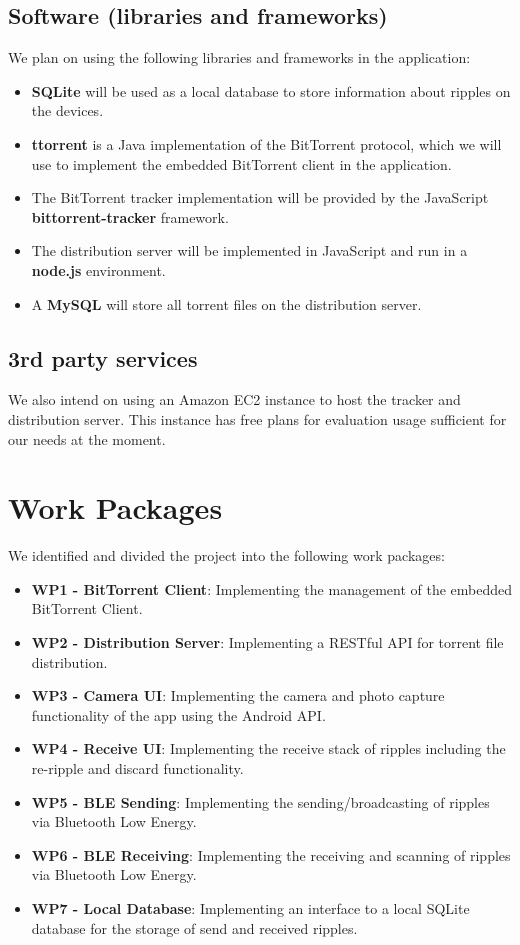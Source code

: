 \documentclass{report}
\begin{document}
\subsection{Software (libraries and frameworks)}
We plan on using the following libraries and frameworks in the application:
\begin{itemize}
  \item \textbf{SQLite} \cite{sqliteLink} will be used as a local database to store information about ripples on the devices.
  \item \textbf{ttorrent} \cite{ttorrentLink} is a Java implementation of the BitTorrent protocol, which we will use to implement the embedded BitTorrent client in the application.
  \item The BitTorrent tracker implementation will be provided by the JavaScript \textbf{bittorrent-tracker} \cite{bittorrentTrackerLink} framework.
  \item The distribution server will be implemented in JavaScript and run in a \textbf{node.js} \cite{nodejsLink} environment.
  \item A \textbf{MySQL} \cite{MySQLLink} will store all torrent files on the distribution server.
\end{itemize}

\subsection{3rd party services}
We also intend on using an Amazon EC2 instance to host the tracker and distribution server.
This instance has free plans for evaluation usage sufficient for our needs at the moment.

\section{Work Packages}
We identified and divided the project into the following work packages: 

\begin{itemize}
    \item {\bf WP1 - BitTorrent Client}: Implementing the management of the embedded BitTorrent Client.
    \item {\bf WP2 - Distribution Server}: Implementing a RESTful API for torrent file distribution.
    \item {\bf WP3 - Camera UI}: Implementing the camera and photo capture functionality of the app using the Android API.
    \item {\bf WP4 - Receive UI}: Implementing the receive stack of ripples including the re-ripple and discard functionality.
    \item {\bf WP5 - BLE Sending}: Implementing the sending/broadcasting of ripples via Bluetooth Low Energy.
    \item {\bf WP6 - BLE Receiving}: Implementing the receiving and scanning of ripples via Bluetooth Low Energy.
    \item {\bf WP7 - Local Database}: Implementing an interface to a local SQLite database for the storage of send and received ripples.
\end{itemize}
\end{document}
